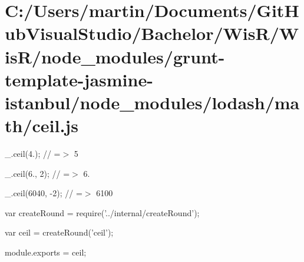 \hypertarget{_c_1_2_users_2martin_2_documents_2_git_hub_visual_studio_2_bachelor_2_wis_r_2_wis_r_2node_moduled2b674db9db96ea11de28ed69d07d8fd}{}\section{C\+:/\+Users/martin/\+Documents/\+Git\+Hub\+Visual\+Studio/\+Bachelor/\+Wis\+R/\+Wis\+R/node\+\_\+modules/grunt-\/template-\/jasmine-\/istanbul/node\+\_\+modules/lodash/math/ceil.\+js}
\+\_\+.\+ceil(4.); // =$>$ 5

\+\_\+.\+ceil(6., 2); // =$>$ 6.

\+\_\+.\+ceil(6040, -\/2); // =$>$ 6100


\begin{DoxyCodeInclude}
var createRound = require(\textcolor{stringliteral}{'../internal/createRound'});

var ceil = createRound(\textcolor{stringliteral}{'ceil'});

module.exports = ceil;
\end{DoxyCodeInclude}
 